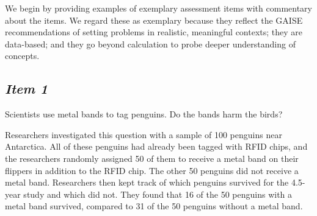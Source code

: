 We begin by providing examples of exemplary assessment items with commentary about the items. We regard these as exemplary because they reflect the GAISE recommendations of setting problems in realistic, meaningful contexts; they are data-based; and they go beyond calculation to probe deeper understanding of concepts. 






\subsection{\textbf{\textit{Item 1}}}


Scientists use metal bands to tag penguins. Do the bands harm the birds? 


Researchers investigated this question with a sample of 100 penguins near Antarctica. All of these penguins had already been tagged with RFID chips, and the researchers randomly assigned 50 of them to receive a metal band on their flippers in addition to the RFID chip. The other 50 penguins did not receive a metal band. Researchers then kept track of which penguins survived for the 4.5-year study and which did not. They found that 16 of the 50 penguins with a metal band survived, compared to 31 of the 50 penguins without a metal band. 


